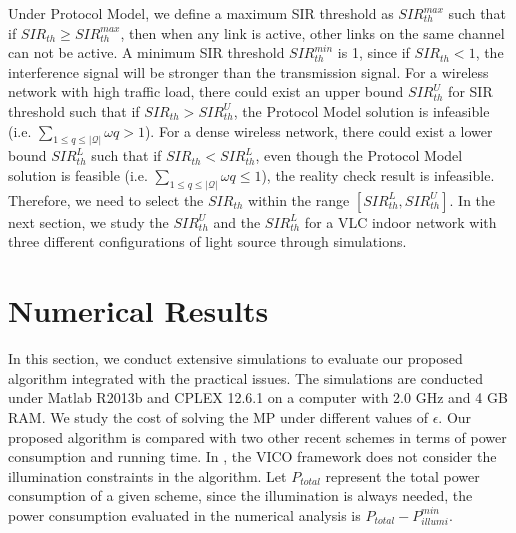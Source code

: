 \documentclass[10pt,journal]{IEEEtran}
\begin{document}
Under Protocol Model, we define a maximum SIR threshold as $SIR_{th}^{max}$ such that if $SIR_{th}\geq SIR_{th}^{max}$, then when any link is active, other links on the same channel can not be active. A minimum SIR threshold $SIR_{th}^{min}$ is 1, since if $SIR_{th}<1$, the interference signal will be stronger than the transmission signal. For a wireless network with high traffic load, there could exist an upper bound $SIR_{th}^{U}$ for SIR threshold such that if $SIR_{th}>SIR_{th}^{U}$, the Protocol Model solution is infeasible (i.e. $\sum_{1\leq q\leq|\mathcal{Q}|}\omega{q}>1$). For a dense wireless network, there could exist a lower bound $SIR_{th}^{L}$ such that if $SIR_{th}<SIR_{th}^{L}$, even though the Protocol Model solution is feasible (i.e. $\sum_{1\leq q\leq|\mathcal{Q}|}\omega{q}\leq1$), the reality check result is infeasible. Therefore, we need to select the $SIR_{th}$ within the range $[SIR_{th}^{L}, SIR_{th}^{U}]$. In the next section, we study the $SIR_{th}^{U}$ and the $SIR_{th}^{L}$ for a VLC indoor network with three different configurations of light source through simulations.



\section{Numerical Results}\label{numerical_analysis}
In this section, we conduct extensive simulations to evaluate our proposed algorithm integrated with the practical issues. The simulations are conducted under Matlab R2013b and CPLEX 12.6.1 \cite{cplex2014v12} on a computer with 2.0 GHz and 4 GB RAM. We study the cost of solving the MP under different values of $\epsilon$. Our proposed algorithm is compared with two other recent schemes \cite{li2012vico,tao2015scheduling} in terms of power consumption and running time. In \cite{li2012vico}, the VICO framework does not consider the illumination constraints in the algorithm. Let $P_{total}$ represent the total power consumption of a given scheme, since the illumination is always needed, the power consumption evaluated in the numerical analysis is $P_{total}-P_{illumi}^{min}$.
\end{document}
